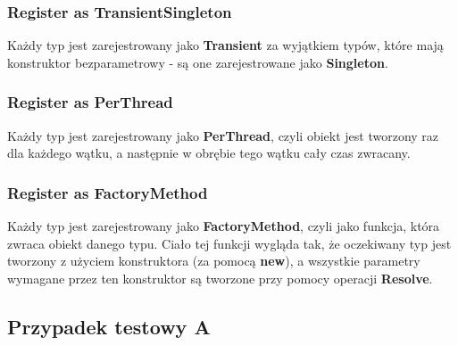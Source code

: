 \documentclass[12pt]{article}
\begin{document}
\subsubsection{Register as TransientSingleton}
Każdy typ jest zarejestrowany jako \textbf{Transient} za wyjątkiem typów, które mają konstruktor bezparametrowy - są one zarejestrowane jako \textbf{Singleton}.

\subsubsection{Register as PerThread}
Każdy typ jest zarejestrowany jako \textbf{PerThread}, czyli obiekt jest tworzony raz dla każdego wątku, a następnie w obrębie tego wątku cały czas zwracany.

\subsubsection{Register as FactoryMethod}
Każdy typ jest zarejestrowany jako \textbf{FactoryMethod}, czyli jako funkcja, która zwraca obiekt danego typu. Ciało tej funkcji wygląda tak, że oczekiwany typ jest tworzony z użyciem konstruktora (za pomocą \textbf{new}), a wszystkie parametry wymagane przez ten konstruktor są tworzone przy pomocy operacji \textbf{Resolve}.


\subsection{Przypadek testowy A}
\end{document}
